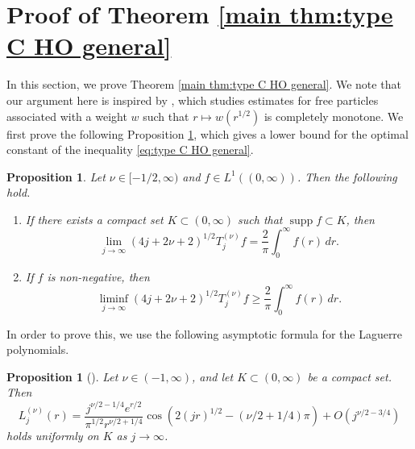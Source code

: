 \documentclass[reqno]{amsart}
\theoremstyle{plain}
\newtheorem{proposition}[theorem]{Proposition}
\numberwithin{equation}{section}
\theoremstyle{remark}
\newcommand{\intervaloo}[2]{(#1, #2)}
\newcommand{\intervalco}[2]{[#1, #2)}
\newcommand{\Tjnuf}[3]{T_{#1}^{(#2)}#3}
\DeclareMathOperator{\supp}{supp}
\newcommand{\LaguerreL}[2]{L_{#1}^{(#2)}}
\begin{document}
\section{Proof of Theorem \ref{main thm:type C HO general}} \label{section:proof type C}
In this section, we prove Theorem \ref{main thm:type C HO general}. We note that our argument here is inspired by \citet{Suz2025_2}, which studies estimates for free particles associated with a weight $w$ such that $r \longmapsto w(r^{1/2})$ is completely monotone.
We first prove the following Proposition \ref{prop:asymptotic behavior}, which gives a lower bound for the optimal constant of the inequality \eqref{eq:type C HO general}.
\begin{proposition} \label{prop:asymptotic behavior}
Let $\nu \in \intervalco{-1/2}{\infty}$ and $f \in L^1(\intervaloo{0}{\infty})$. Then the following hold.
\begin{enumerate}[label=\textup{(\roman*)}]
\item \label{item:asymptotic behavior for compactly supported f} 
If there exists a compact set $K \subset \intervaloo{0}{\infty}$ such that $\supp f \subset K$, then
\begin{equation} \label{eq:asymptotic behavior for compactly supported f} 
	\lim_{j \to \infty} (4j+2\nu+2)^{1/2} \Tjnuf{j}{\nu}{f} = \frac{2}{\pi} \int_{0}^{\infty} f(r) \, dr .
\end{equation}
\item \label{item:asymptotic behavior for non-negative f} 
 If $f$ is non-negative, then 
\begin{equation} \label{eq:asymptotic behavior for non-negative f} 
	\liminf_{j \to \infty} (4j+2\nu+2)^{1/2} \Tjnuf{j}{\nu}{f} \geq \frac{2}{\pi} \int_{0}^{\infty} f(r) \, dr .
\end{equation}
\end{enumerate}
\end{proposition}
In order to prove this, we use the following asymptotic formula for the Laguerre polynomials.
\begin{proposition}[{\cite[Theorem 8.22.1]{Sze1975}}]
	Let $\nu \in \intervaloo{-1}{\infty}$, and let $K \subset \intervaloo{0}{\infty}$ be a compact set. Then
	\begin{equation} \label{eq:asymptotic behavior for Laguerre polynomial}
		\LaguerreL{j}{\nu}(r) = \frac{j^{\nu/2-1/4} e^{r/2}}{\pi^{1/2} r^{\nu/2+1/4}} \cos{ (2(jr)^{1/2} - (\nu/2+1/4)\pi )} + O(j^{\nu/2-3/4})
	\end{equation}
	holds uniformly on $K$ as $j \to \infty$. 
\end{proposition}
\end{document}
